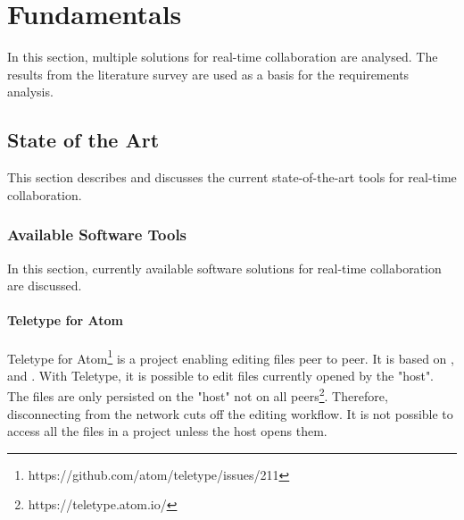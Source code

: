 \chapter{Fundamentals}
\label{sec:fundamentals}

In this section, multiple solutions for real-time collaboration are analysed. 
The results from the literature survey are used as a basis for the requirements analysis.

\section{State of the Art}
\label{sec:stateoftheart}

This section describes and discusses the current state-of-the-art tools for real-time collaboration.

\subsection{Available Software Tools}

In this section, currently available software solutions for real-time collaboration are discussed.

\subsubsection{Teletype for Atom}
Teletype for Atom\footnote{https://github.com/atom/teletype/issues/211} is a project enabling editing files peer to peer. It is based on \cite{Oster:2006:DataconsistencyforP2Pcollaborativeediting}, \cite{YuWeihai:2014} and \cite{BriotUrsoShapiro:2016:HighResponsivenessGroupEditing}.
With Teletype, it is possible to edit files currently opened by the "host". The files are only persisted on the "host" not on all peers\footnote{https://teletype.atom.io/}.
Therefore, disconnecting from the network cuts off the editing workflow. It is not possible to access all the files in a project unless the host opens them. 
